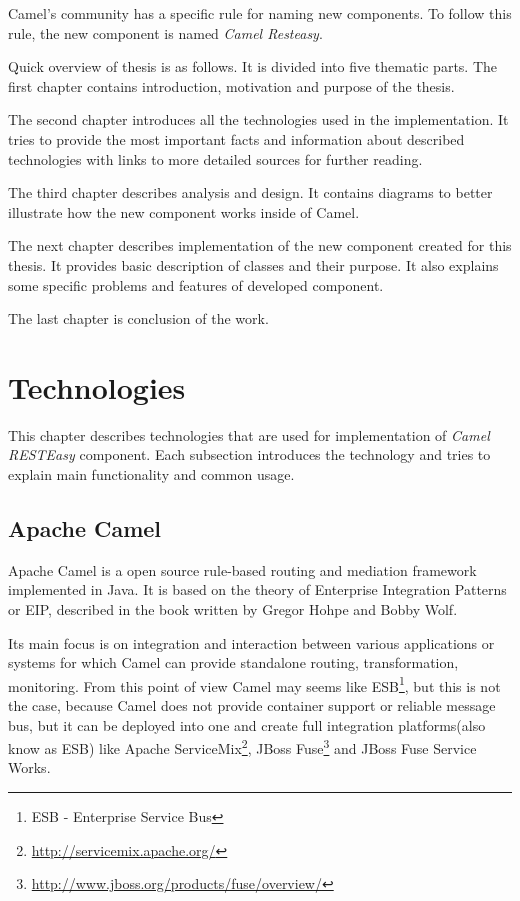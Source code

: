 \documentclass[12pt,final,oneside]{fithesis2}
\begin{document}
Camel's community has a specific rule for naming  new components. To follow this rule, the new component is named \textit{Camel Resteasy}.

Quick overview of thesis is as follows. It is divided into five thematic parts. The first chapter
contains introduction, motivation and purpose of the thesis.

The second chapter introduces all the technologies used in the implementation. It tries to provide the most important facts and information about described technologies with links to more detailed sources for further reading.

The third chapter describes analysis and design. It contains diagrams to better illustrate how the new component works inside of Camel.

The next chapter describes implementation of the new component created for this thesis. It provides basic description of classes and their purpose. It also explains some specific problems and features of developed component.

The last chapter is conclusion of the work.


\chapter{Technologies}\label{tech}
This chapter describes technologies that are used for implementation of \textit{Camel RESTEasy}  component. Each subsection introduces the technology and tries to explain main functionality and common usage.

\section{Apache Camel}
Apache Camel is a open source rule-based routing and mediation framework implemented in Java\cite{java-web}. It is based on the theory of Enterprise Integration Patterns or EIP, described in the book written by Gregor Hohpe and Bobby Wolf\cite{eip}.

Its main focus is on integration and interaction between various applications or systems for which Camel can provide standalone routing, transformation, monitoring. From this point of view Camel may seems like ESB\footnote{ESB - Enterprise Service Bus}, but this is not the case, because Camel does not provide container support or reliable message bus, but it can be deployed into one and create full integration platforms(also know as ESB) like Apache ServiceMix\footnote{\url{http://servicemix.apache.org/}}, JBoss Fuse\footnote{\url{http://www.jboss.org/products/fuse/overview/}} and JBoss Fuse Service Works. 
\end{document}
